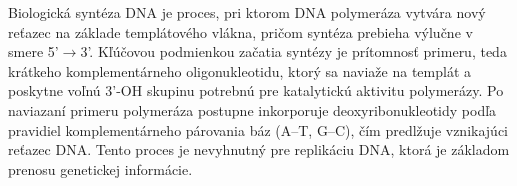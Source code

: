 Biologická syntéza DNA je proces,
pri ktorom DNA polymeráza vytvára
nový reťazec na základe templátového vlákna, pričom syntéza
prebieha výlučne v smere 5'$\rightarrow$3'. Kľúčovou podmienkou začatia
syntézy je prítomnosť primeru, teda krátkeho komplementárneho
oligonukleotidu, ktorý sa naviaže na templát a poskytne voľnú
3'-OH skupinu potrebnú pre katalytickú aktivitu polymerázy.
Po naviazaní primeru polymeráza postupne inkorporuje deoxyribonukleotidy
podľa pravidiel komplementárneho párovania báz (A--T, G--C), čím predlžuje
vznikajúci reťazec DNA. Tento proces je nevyhnutný pre replikáciu DNA, ktorá je základom
prenosu genetickej informácie.
